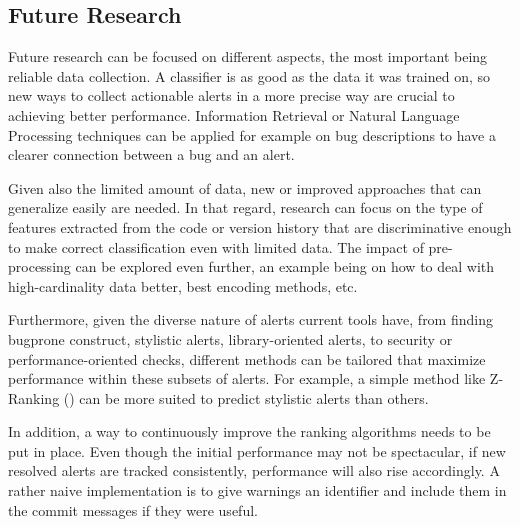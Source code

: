 
\subsection{Future Research}


Future research can be focused on different aspects, the most important being reliable data collection. A classifier is as good as the data it was trained on, so new ways to collect actionable alerts in a more precise way are crucial to achieving better performance. Information Retrieval or Natural Language Processing techniques can be applied for example on bug descriptions to have a clearer connection between a bug and an alert.

Given also the limited amount of data, new or improved approaches that can generalize easily are needed. In that regard, research can focus on the type of features extracted from the code or version history that are discriminative enough to make correct classification even with limited data. The impact of pre-processing can be explored even further, an example being on how to deal with high-cardinality data better, best encoding methods, etc.

Furthermore, given the diverse nature of alerts current tools have, from finding bugprone construct, stylistic alerts, library-oriented alerts, to security or performance-oriented checks, different methods can be tailored that maximize performance within these subsets of alerts. For example, a simple method like Z-Ranking (\cite{z-ranking}) can be more suited to predict stylistic alerts than others.

In addition, a way to continuously improve the ranking algorithms needs to be put in place. Even though the initial performance may not be spectacular, if new resolved alerts are tracked consistently, performance will also rise accordingly. A rather naive implementation is to give warnings an identifier and include them in the commit messages if they were useful.

